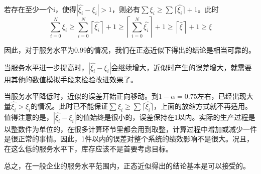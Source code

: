 若存在至少一个i，使得$|\hat{\xi_i}-\xi_i| > 1$，则必有$\sum\xi_i \geq \sum\lceil\hat{\xi_i}\rceil + 1$。此时
\begin{equation}
\sum_{i=0}^N \xi_i \geq \sum_{i=0}^N\left\lceil\hat{\xi_i}\right\rceil + 1 \geq \left\lceil\sum_{i=0}^N\hat{\xi_i}\right\rceil + 1 \geq \left\lceil\hat{\xi}\right\rceil + 1 \geq \xi
\end{equation}

因此，对于服务水平为0.99的情况，我们在正态近似下得出的结论是相当可靠的。

当服务水平进一步提高时，$|\hat{\xi_i}-\xi_i|$会继续增大，近似时产生的误差增大，就需要用其他的数值模拟手段来检验改进效果了。

当服务水平降低时，近似的误差开始正向移动。到$1-\alpha=0.75$左右，已经出现大量$\hat{\xi_i} > \xi_i$的情况。此时已不能保证$\sum\xi_i \geq \sum\lceil\hat{\xi_i}\rceil$，上面的放缩方式就不再适用。值得注意的是，$|\hat{\xi_i}-\xi_i|$的值始终是很小的，误差保持在1以内。实际的生产过程是以整数件为单位的，在很多计算环节里都会用到取整，计算过程中增加或减少一件是很正常的事情。因此，1件以内的误差对整个系统的绩效影响不是很大。况且，在这么低的服务水平下，库存应该不是首要考虑目标。

总之，在一般企业的服务水平范围内，正态近似得出的结论基本是可以接受的。






